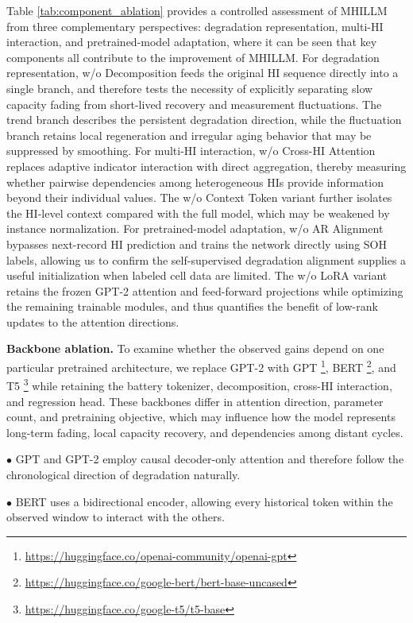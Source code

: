 \documentclass[preprint,12pt]{elsarticle}
\begin{document}
Table \ref{tab:component_ablation} provides a controlled assessment of MHILLM from three complementary perspectives: degradation representation, multi-HI interaction, and pretrained-model adaptation, where it can be seen that key components all contribute to the improvement of MHILLM.
For degradation representation, w/o Decomposition feeds the original HI sequence directly into a single branch, and therefore tests the necessity of explicitly separating slow capacity fading from short-lived recovery and measurement fluctuations.  
The trend branch describes the persistent degradation direction, while the fluctuation branch retains local regeneration and irregular aging behavior that may be suppressed by smoothing. 
For multi-HI interaction, w/o Cross-HI Attention replaces adaptive indicator interaction with direct aggregation, thereby measuring whether pairwise dependencies among heterogeneous HIs provide information beyond their individual values. 
The w/o Context Token variant further isolates the HI-level context compared with the full model,  which may be weakened by instance normalization. 
For pretrained-model adaptation, w/o AR Alignment bypasses next-record HI prediction and trains the network directly using SOH labels, allowing us to confirm the self-supervised degradation alignment supplies a useful initialization when labeled cell data are limited. 
The w/o LoRA variant retains the frozen GPT-2 attention and feed-forward projections while optimizing the remaining trainable modules, and thus quantifies the benefit of low-rank updates to the attention directions. 



\textbf{Backbone ablation.} To examine whether the observed gains depend on one particular pretrained architecture, we replace GPT-2 with GPT \footnote{ \url{https://huggingface.co/openai-community/openai-gpt}}, BERT \footnote{ \url{ https://huggingface.co/google-bert/bert-base-uncased}}, and T5 \footnote{ \url{https://huggingface.co/google-t5/t5-base}} while retaining the battery tokenizer, decomposition, cross-HI interaction, and regression head.  These backbones differ in attention direction, parameter count, and pretraining objective, which may influence how the model represents long-term fading, local capacity recovery, and dependencies among distant cycles. 

$\bullet$ GPT and GPT-2 employ causal decoder-only attention and therefore follow the chronological direction of degradation naturally. 

$\bullet$ BERT uses a bidirectional encoder, allowing every historical token within the observed window to interact with the others.
\end{document}

